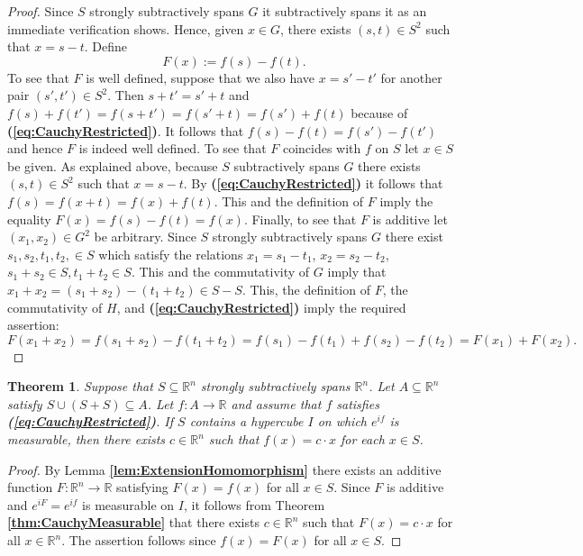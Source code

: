 \documentclass[12 pt]{amsart}
\newtheorem{thm}{Theorem}[section]
\theoremstyle{definition}
\newcommand{\R}{\mathbb{R}}
\newcommand{\bref}[1]{\textbf{\ref{#1}}} %
\newcommand{\beqref}[1]{\textbf{(\ref{#1})}} %
\begin{document}
\begin{proof}
Since $S$ strongly subtractively spans $G$  it subtractively spans it as an immediate verification shows.
Hence, given $x\in G$, there exists $(s,t)\in S^2$ such that $x=s-t$. Define 
\begin{equation*}
F(x):=f(s)-f(t).
\end{equation*}
To see that $F$ is well defined, suppose that we also have $x=s'-t'$ for another pair  $(s',t')\in S^2$. Then 
$s+t'=s'+t$ and $f(s)+f(t')=f(s+t')=f(s'+t)=f(s')+f(t)$ because of \beqref{eq:CauchyRestricted}. 
It follows that $f(s)-f(t)=f(s')-f(t')$ and hence $F$ is indeed well defined. 
To see that $F$ coincides with $f$ on $S$ let $x\in S$ be given. As explained above, because $S$ 
subtractively spans $G$ there exists $(s,t)\in S^2$ such that $x=s-t$. 
By \beqref{eq:CauchyRestricted} it follows that $f(s)=f(x+t)=f(x)+f(t)$. 
This and the definition of $F$ imply the equality $F(x)=f(s)-f(t)=f(x)$. Finally, 
to see that $F$ is additive let $(x_1,x_2)\in G^2$ be arbitrary. 
Since $S$ strongly subtractively spans $G$ there exist $s_1,s_2,t_1,t_2,\in S$ which 
satisfy the relations  $x_1=s_1-t_1$, $x_2=s_2-t_2$, $s_1+s_2\in S, t_1+t_2\in S$. 
This and the commutativity of $G$ imply that $x_1+x_2=(s_1+s_2)-(t_1+t_2)\in S-S$. 
This, the definition of $F$, the commutativity of $H$, and \beqref{eq:CauchyRestricted} imply the required assertion: 
\begin{equation*}
F(x_1+x_2)=f(s_1+s_2)-f(t_1+t_2)=f(s_1)-f(t_1)+f(s_2)-f(t_2)=F(x_1)+F(x_2). 
\end{equation*}
\end{proof}
 

\begin{thm}\label{thm:RestrictedCauchy}
Suppose that $S\subseteq \R^n$ strongly subtractively spans $\R^n$. 
Let $A\subseteq \R^n$ satisfy $S\cup(S+S)\subseteq A$. 
Let $f:A\to\R$ and assume that $f$ satisfies \beqref{eq:CauchyRestricted}.
If $S$ contains a hypercube $I$ on which   $e^{if}$ is measurable, then 
there exists $c\in\R^n$ such that $f(x)=c\cdot x$ for each $x\in S$. 
\end{thm}
\begin{proof}
By Lemma \bref{lem:ExtensionHomomorphism} there exists an additive function 
$F:\R^n\to\R$ satisfying $F(x)=f(x)$ for all $x\in S$. 
Since $F$ is additive and $e^{iF}=e^{if}$ is measurable on $I$, it follows from 
Theorem \bref{thm:CauchyMeasurable} that there exists $c\in \R^n$ such 
that $F(x)=c\cdot x$ for all $x\in \R^n$. The assertion follows since 
$f(x)=F(x)$ for all $x\in S$. 
\end{proof}
\end{document}
